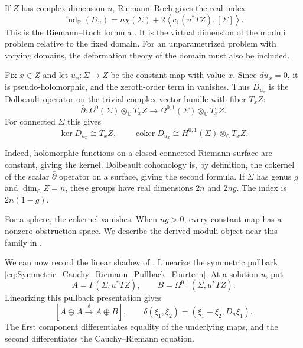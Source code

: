 If $Z$ has complex dimension $n$, Riemann--Roch gives the real index
\begin{equation}
  \label{eq:Cauchy_Riemann_Index_Fourteen}
  \operatorname{ind}_{\mathbb R}(D_u)
  =
  n\chi(\Sigma)
  +2\left\langle c_1(u^*TZ),[\Sigma]\right\rangle.
\end{equation}
This is the Riemann--Roch formula
\cite[Theorem~3.22]{Wendl_Lectures_Holomorphic_Curves}.
It is the virtual dimension of the moduli problem
relative to the fixed domain. For an unparametrized problem with varying
domains, the deformation theory of the domain must also be included.

\begin{example}
Fix $x\in Z$ and let $u_x\colon\Sigma\to Z$ be the constant map with value
$x$. Since $du_x=0$, it is pseudo-holomorphic, and the zeroth-order term in
 vanishes. Thus
$D_{u_x}$ is the Dolbeault operator on the trivial complex vector bundle with
fiber $T_xZ$:
\[
  \bar\partial\colon
  \Omega^0(\Sigma)\otimes_{\mathbb C}T_xZ
  \longrightarrow
  \Omega^{0,1}(\Sigma)\otimes_{\mathbb C}T_xZ.
\]
For connected $\Sigma$ this gives
\begin{equation}
  \label{eq:Constant_Map_Deformation_Obstruction_Fourteen}
  \ker D_{u_x}\cong T_xZ,
  \qquad
  \operatorname{coker}D_{u_x}
  \cong
  H^{0,1}(\Sigma)\otimes_{\mathbb C}T_xZ.
\end{equation}

Indeed, holomorphic functions on a closed connected Riemann surface are
constant, giving the kernel. Dolbeault cohomology is, by definition, the
cokernel of the scalar $\bar\partial$ operator on a surface, giving the
second formula. If $\Sigma$ has genus $g$ and $\dim_{\mathbb C}Z=n$, these
groups have real dimensions $2n$ and $2ng$. The index is $2n(1-g)$.

For a sphere, the cokernel vanishes. When $ng>0$, every constant map
has a nonzero obstruction space. We describe the derived moduli object
near this family in .
\end{example}

We can now record the linear shadow of
.
Linearize the symmetric pullback \eqref{eq:Symmetric_Cauchy_Riemann_Pullback_Fourteen}.
At a solution $u$, put
\[
  A=\Gamma(\Sigma,u^*TZ),
  \qquad
  B=\Omega^{0,1}(\Sigma,u^*TZ).
\]
Linearizing this pullback presentation gives
\begin{equation}
  \label{eq:Symmetric_Tangent_Complex_Fourteen}
  \left[
    A\oplus A
    \xrightarrow{\delta}
    A\oplus B
  \right],
  \qquad
  \delta(\xi_1,\xi_2)
  =
  (\xi_1-\xi_2,D_u\xi_1).
\end{equation}
The first component differentiates equality of the underlying maps, and the
second differentiates the Cauchy--Riemann equation.

